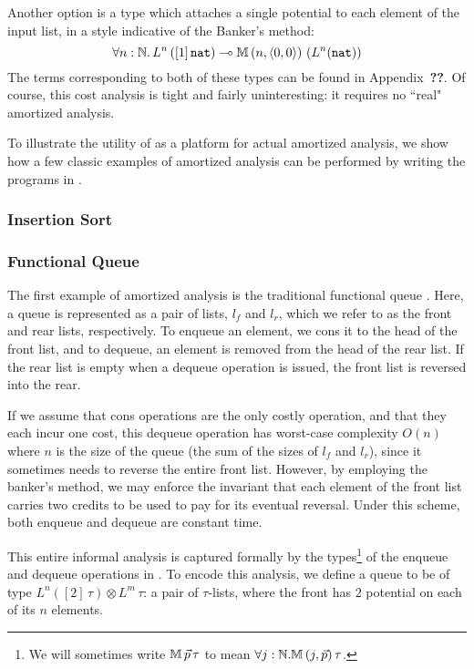 Another option is a type which attaches a single potential to each element of the input list, in a style indicative of the Banker's method:
$$
\forall n : \mathbb{N} .\, L^n\left([1] \, \texttt{nat}\right) \multimap \mathbb{M} \, (n,\langle 0,0 \rangle) \, \left(L^n(\texttt{nat})\right)
$$
The terms corresponding to both of these types can be found in Appendix~\textbf{??}. Of course, this cost analysis is tight and fairly uninteresting: it requires no ``real" amortized analysis.

To illustrate the utility of \dlambdaamor as a platform for actual amortized analysis, we show how a few classic examples of amortized analysis can be performed by writing the programs in \dlambdaamor.

\subsubsection{Insertion Sort}

\subsubsection{Functional Queue}
The first example of amortized analysis is the traditional functional queue \citehere. Here, a queue is represented as a pair of lists, $l_f$ and $l_r$, which we refer to as the front and rear lists, respectively. To enqueue an element, we cons it to the head of the front list, and to dequeue, an element is removed from the head of the rear list. If the rear list is empty when a dequeue operation is issued, the front list is reversed into the rear.

If we assume that cons operations are the only costly operation, and that they each incur one cost, this dequeue operation has worst-case complexity $O(n)$ where $n$ is the size of the queue (the sum of the sizes of $l_f$ and $l_r$), since it sometimes needs to reverse the entire front list. However, by employing the banker's method, we may enforce the invariant that each element of the front list carries two credits to be used to pay for its eventual reversal. Under this scheme, both enqueue and dequeue are constant time.

This entire informal analysis is captured formally by the types\footnote{
We will sometimes write $\mathbb{M} \, \vec{p} \, \tau$ to mean $\forall j : \mathbb{N}. \mathbb{M} \, (j,\vec{p}) \, \tau$.
} of the enqueue and dequeue operations in \dlambdaamor. To encode this analysis, we define a queue to be of type $ L^n([2] \, \tau) \otimes L^m \, \tau$: a pair of $\tau$-lists, where the front has $2$ potential on each of its $n$ elements.

